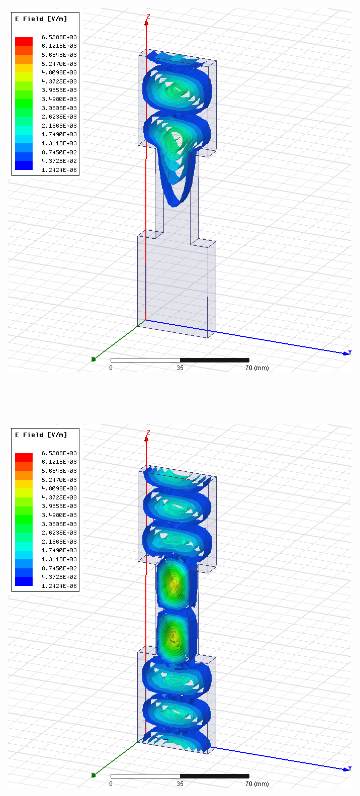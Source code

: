 \documentclass[12pt,a4paper]{article}
\begin{document}
\begin{figure}
\begin{subfigure}[b]{0.49\textwidth}
    \includegraphics[width=\textwidth]{./mid_sec_20mm_wide_50mm_long/7ghz.png}
    \label{fig:2_2050_7ghz}
  \end{subfigure}\\
  \begin{subfigure}[b]{0.49\textwidth}
    \includegraphics[width=\textwidth]{./mid_sec_20mm_wide_50mm_long/9ghz.png}

\end{subfigure}
\end{figure}
\end{document}
